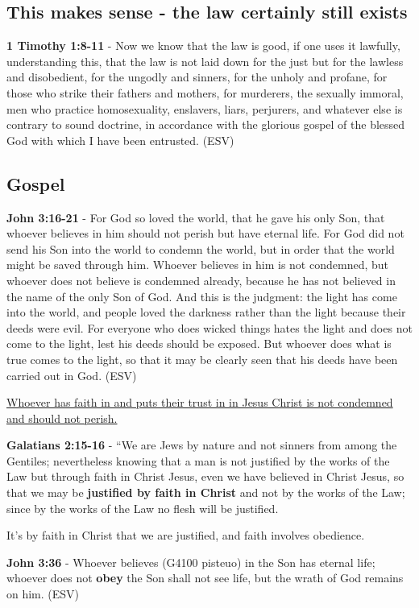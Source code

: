 \documentclass[11pt]{article}
\begin{document}
\subsection{This makes sense - the law certainly still exists}
\label{sec:orgbe3cf52}
\textbf{1 Timothy 1:8-11} -  Now we know that the law is good, if one uses it lawfully, understanding this, that the law is not laid down for the just but for the lawless and disobedient, for the ungodly and sinners, for the unholy and profane, for those who strike their fathers and mothers, for murderers, the sexually immoral, men who practice homosexuality, enslavers, liars, perjurers, and whatever else is contrary to sound doctrine, in accordance with the glorious gospel of the blessed God with which I have been entrusted.  (ESV)

\subsection{Gospel}
\label{sec:orgabdc0ff}
\textbf{John 3:16-21} - For God so loved the world, that he gave his only Son, that whoever believes in him should not perish but have eternal life. For God did not send his Son into the world to condemn the world, but in order that the world might be saved through him. Whoever believes in him is not condemned, but whoever does not believe is condemned already, because he has not believed in the name of the only Son of God. And this is the judgment: the light has come into the world, and people loved the darkness rather than the light because their deeds were evil. For everyone who does wicked things hates the light and does not come to the light, lest his deeds should be exposed. But whoever does what is true comes to the light, so that it may be clearly seen that his deeds have been carried out in God. (ESV)

\uline{Whoever has faith in and puts their trust in in Jesus Christ is not condemned and should not perish.}

\textbf{Galatians 2:15-16} - “We are Jews by nature and not sinners from among the Gentiles; nevertheless knowing that a man is not justified by the works of the Law but through faith in Christ Jesus, even we have believed in Christ Jesus, so that we may be \textbf{justified by faith in Christ} and not by the works of the Law; since by the works of the Law no flesh will be justified.

It's by faith in Christ that we are justified, and faith involves obedience.

\textbf{John 3:36} - Whoever believes (G4100 pisteuo) in the Son has eternal life; whoever does not \textbf{obey} the Son shall not see life, but the wrath of God remains on him. (ESV)
\end{document}
